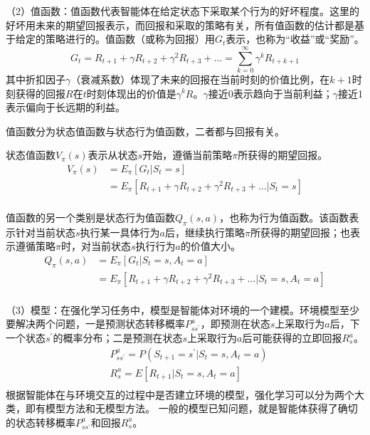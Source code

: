 （2）值函数：值函数代表智能体在给定状态下采取某个行为的好坏程度。这里的好坏用未来的期望回报表示，而回报和采取的策略有关，所有值函数的估计都是基于给定的策略进行的。值函数（或称为回报）用$G_t$表示，也称为“收益”或“奖励”。
\begin{equation}\label{G_t}
    G_t = R_{t+1} + \gamma R_{t+2} + \gamma^2 R_{t+3} + \dots = \sum_{k=0}^\infty \gamma^k R_{t+k+1}
\end{equation} 
其中折扣因子$\gamma$（衰减系数）体现了未来的回报在当前时刻的价值比例，在$k+1$时刻获得的回报$R$在$t$时刻体现出的价值是$\gamma^k R$。$\gamma$接近0表示趋向于当前利益；$\gamma$接近1表示偏向于长远期的利益。

值函数分为状态值函数与状态行为值函数，二者都与回报有关。

状态值函数$V_{\pi}(s)$表示从状态$s$开始，遵循当前策略$\pi$所获得的期望回报。
\begin{equation}
    \begin{aligned}
        V_{\pi}(s) &= E_{\pi}[G_t | S_t = s]\\
                     &= E_{\pi}[R_{t+1} + \gamma R_{t+2} + \gamma^2 R_{t+3} + \dots | S_t = s]\\
    \end{aligned}
\end{equation}

值函数的另一个类别是状态行为值函数$Q_{\pi}(s,a)$，也称为行为值函数。该函数表示针对当前状态$s$执行某一具体行为$a$后，继续执行策略$\pi$所获得的期望回报；也表示遵循策略$\pi$时，对当前状态$s$执行行为$a$的价值大小。
\begin{equation}
    \begin{aligned}
        Q_{\pi}(s,a) &= E_{\pi}[G_t | S_t = s, A_t =a]\\
                     &= E_{\pi}[R_{t+1} + \gamma R_{t+2} + \gamma^2 R_{t+3} + \dots | S_t = s, A_t =a]\\
    \end{aligned}
\end{equation}

（3）模型：在强化学习任务中，模型是智能体对环境的一个建模。环境模型至少要解决两个问题，一是预测状态转移概率$P_{ss^{'}}^a$，即预测在状态$s$上采取行为$a$后，下一个状态$s^{'}$的概率分布；二是预测在状态$s$上采取行为$a$后可能获得的立即回报$R_s^a$。
\begin{equation}
    \begin{aligned}
        & P_{ss^{'}}^a = P(S_{t+1} = s^{'} | S_t = s, A_t = a) \\
        & R_s^a = E[R_{t+1} | S_t = s, A_t = a] \\
    \end{aligned}
\end{equation}
根据智能体在与环境交互的过程中是否建立环境的模型，强化学习可以分为两个大类，即有模型方法和无模型方法。
一般的模型已知问题，就是智能体获得了确切的状态转移概率$P_{ss^{'}}^a$和回报$R_s^a$。


